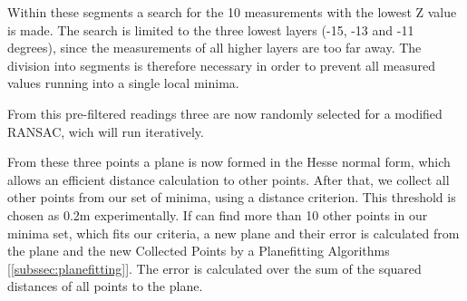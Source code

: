 \documentclass[11pt,oneside,openright]{mpreport}
\begin{document}



Within these segments a search for the 10 measurements with the lowest Z value is made. The search is limited to the three lowest layers (-15, -13 and -11 degrees),
since the measurements of all higher layers are too far away. The division into segments is therefore necessary in order to prevent all measured values running into a single local minima. 


From this pre-filtered readings three are now randomly selected for a modified \ac{RANSAC}, wich will run iteratively.

From these three points a plane is now formed in the Hesse normal form, which allows an efficient distance calculation to other points.
After that, we collect all other points from our set of minima, using a distance criterion. This threshold is chosen as 0.2m experimentally.
If can find more than 10 other points in our minima set, which fits our criteria, a new plane and their error is calculated from the plane and
the new Collected Points by a Planefitting Algorithms [\cref{subssec:planefitting}].
The error is calculated over the sum of the squared distances of all points to the plane.
\end{document}
